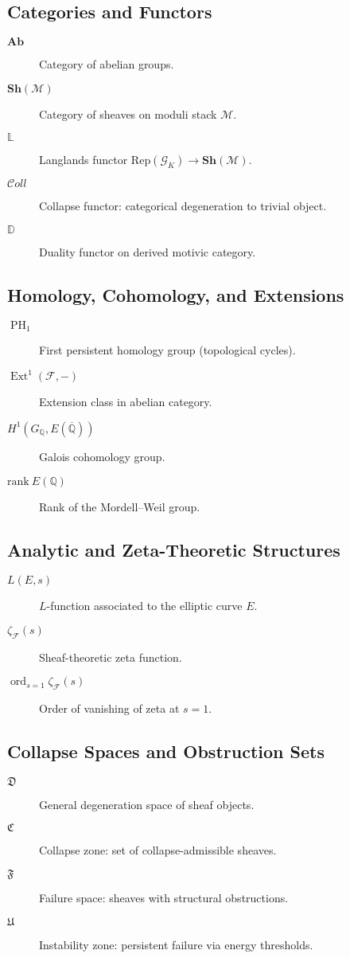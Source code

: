 \documentclass[11pt]{article}
\DeclareMathOperator{\Ext}{Ext}
\DeclareMathOperator{\PH}{PH}
\newcommand{\ord}{\operatorname{ord}}
\begin{document}
\subsection*{Categories and Functors}
\begin{description}
  \item[$\mathbf{Ab}$] Category of abelian groups.
  \item[$\mathbf{Sh}(\mathcal{M})$] Category of sheaves on moduli stack \( \mathcal{M} \).
  \item[$\mathbb{L}$] Langlands functor \( \mathrm{Rep}(\mathcal{G}_K) \to \mathbf{Sh}(\mathcal{M}) \).
  \item[$\mathcal{C}oll$] Collapse functor: categorical degeneration to trivial object.
  \item[$\mathbb{D}$] Duality functor on derived motivic category.
\end{description}

\subsection*{Homology, Cohomology, and Extensions}
\begin{description}
  \item[$\PH_1$] First persistent homology group (topological cycles).
  \item[$\Ext^1(\mathcal{F}, -)$] Extension class in abelian category.
  \item[$H^1(G_{\mathbb{Q}}, E(\overline{\mathbb{Q}}))$] Galois cohomology group.
  \item[$\mathrm{rank}~E(\mathbb{Q})$] Rank of the Mordell–Weil group.
\end{description}

\subsection*{Analytic and Zeta-Theoretic Structures}
\begin{description}
  \item[$L(E, s)$] \( L \)-function associated to the elliptic curve \( E \).
  \item[$\zeta_{\mathcal{F}}(s)$] Sheaf-theoretic zeta function.
  \item[$\ord_{s=1} \zeta_{\mathcal{F}}(s)$] Order of vanishing of zeta at \( s = 1 \).
\end{description}

\subsection*{Collapse Spaces and Obstruction Sets}
\begin{description}
  \item[$\mathfrak{D}$] General degeneration space of sheaf objects.
  \item[$\mathfrak{C}$] Collapse zone: set of collapse-admissible sheaves.
  \item[$\mathfrak{F}$] Failure space: sheaves with structural obstructions.
  \item[$\mathfrak{U}$] Instability zone: persistent failure via energy thresholds.
\end{description}
\end{document}
